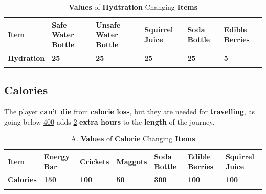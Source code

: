 			\begin{longtable}{|C{5em}|C{4em}|C{4em}|C{4em}|C{4em}|C{4em}|}
			   \toprule
			    \textcolor[rgb]{ 1,  1,  1}{\textbf{Item}} & \textbf{Safe Water Bottle} & \textbf{Unsafe Water Bottle} &\textbf{Squirrel Juice} &\textbf{Soda Bottle} & \textbf{Edible Berries}  \\
			    \midrule
			     \textcolor[rgb]{ 1,  1,  1}{\textbf{Hydration}}  & \textbf{25} & \textbf{25} & \textbf{25} & \textbf{25} & \textbf{5} \\	
			    \bottomrule	
			\caption{\textbf{Values} of \textbf{Hydtration} Changing \textbf{Items}}
			\end{longtable}

		\subsection{Calories}
			\par The player \textbf{can't die} from \textbf{calorie loss}, but they are needed for \textbf{travelling}, as going below \underline{400} adds \underline{2} \textbf{extra hours} to the \textbf{length} of the journey.
			\begin{longtable}{|C{4em}|C{4em}|C{4em}|C{4em}|C{4em}|C{4em}|C{4em}|}
			   \toprule
			    \textcolor[rgb]{ 1,  1,  1}{\textbf{Item}} & \textbf{Energy Bar} &\textbf{Crickets} &\textbf{Maggots} &\textbf{Soda Bottle} & \textbf{Edible Berries} & \textbf{Squirrel Juice}  \\
			    \midrule
			     \textcolor[rgb]{ 1,  1,  1}{\textbf{Calories}} & \textbf{150} & \textbf{100} & \textbf{50} & \textbf{300} & \textbf{100} & \textbf{100}  \\	
			    \bottomrule	
			\caption{A. \textbf{Values} of \textbf{Calorie} Changing \textbf{Items}}
			\end{longtable}

